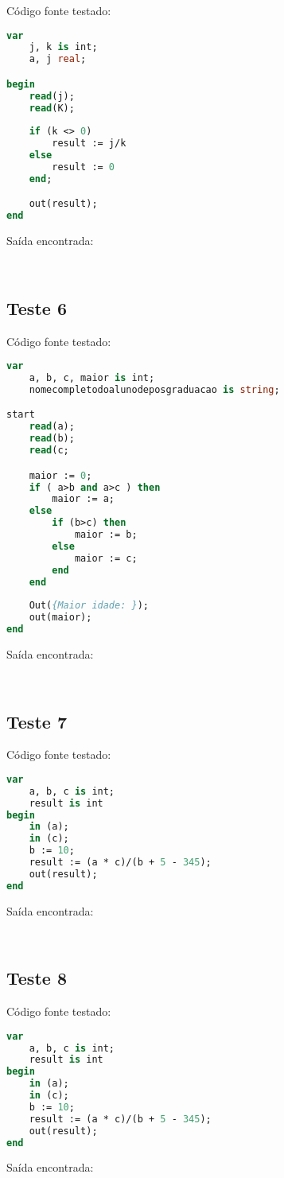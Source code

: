 \documentclass[11pt]{article}
\begin{document}
Código fonte testado:
\begin{lstlisting}[language=Pascal]
var
	j, k is int;
	a, j real;

begin
	read(j);
	read(K);
	
	if (k <> 0)
		result := j/k
	else
		result := 0
	end;

 	out(result);
end
\end{lstlisting}
	
Saída encontrada:
\begin{verbatim}
	
\end{verbatim}




\subsection{Teste 6}

Código fonte testado:
\begin{lstlisting}[language=Pascal]
var
	a, b, c, maior is int;
	nomecompletodoalunodeposgraduacao is string;

start
	read(a);
	read(b);
	read(c;

	maior := 0;
	if ( a>b and a>c ) then
		maior := a;
	else
		if (b>c) then
			maior := b;
		else
			maior := c;
		end
	end
	
	Out({Maior idade: });
	out(maior);
end
\end{lstlisting}
	
Saída encontrada:
\begin{verbatim}
	
\end{verbatim}




\subsection{Teste 7}

Código fonte testado:
\begin{lstlisting}[language=Pascal]
var
	a, b, c is int;
	result is int
begin
	in (a);
	in (c);
	b := 10;
	result := (a * c)/(b + 5 - 345);
	out(result);
end
\end{lstlisting}
	
Saída encontrada:
\begin{verbatim}
	
\end{verbatim}




\subsection{Teste 8}

Código fonte testado:
\begin{lstlisting}[language=Pascal]
var
	a, b, c is int;
	result is int
begin
	in (a);
	in (c);
	b := 10;
	result := (a * c)/(b + 5 - 345);
	out(result);
end
\end{lstlisting}
	
Saída encontrada:
\begin{verbatim}
	
\end{verbatim}
\end{document}
